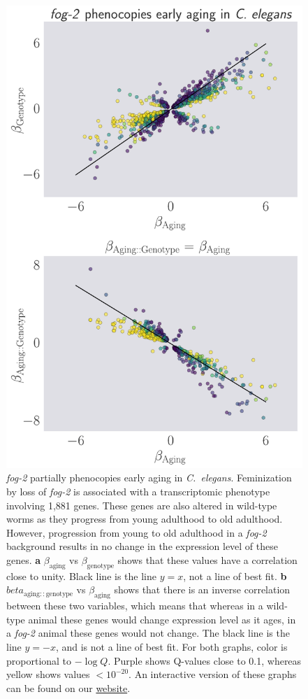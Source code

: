 \documentclass[9pt,twocolumn,twoside]{gsag3jnl}
\newcommand{\cel}{\emph{C.~elegans}}
\newcommand{\fog}{\emph{fog-2}}
\newcommand{\fogn}{1,881}
\newcommand{\webref}{\href{https://wormlabcaltech.github.io/Angeles_And_Leighton_2016/}{website}}
\begin{document}
\begin{figure}[htbp]
\renewcommand{\familydefault}{\sfdefault}\normalfont{}
\centering
\includegraphics[width=\linewidth]{../output/figs/final_figs/aberrant_aging.pdf}
\caption{ \fog{} partially phenocopies early aging in \cel{}. Feminization by loss of \fog{} is associated with a transcriptomic phenotype involving \fogn{} genes. These genes are also altered in wild-type worms as they progress from young adulthood to old adulthood. However, progression from young to old adulthood in a \fog{} background results in no change in the expression level of these genes. \textbf{a} $\beta_\mathrm{aging}$ vs $\beta_\mathrm{genotype}$ shows that these values have a correlation close to unity. Black line is the line $y=x$, not a line of best fit. \textbf{b} $beta_\mathrm{aging::genotype}$ vs $\beta_\mathrm{aging}$ shows that there is an inverse correlation between these two variables, which means that whereas in a wild-type animal these genes would change expression level as it ages, in a \fog{} animal these genes would not change.
The black line is the line $y=-x$, and is not a line of best fit. For both graphs, color is proportional to $-\log{Q}$. Purple shows Q-values close to 0.1, whereas yellow shows values $<10^{-20}$.
An interactive version of these graphs can be found on our \webref{}.
}%
\label{fig:aberrant_aging}
\end{figure}
\end{document}

